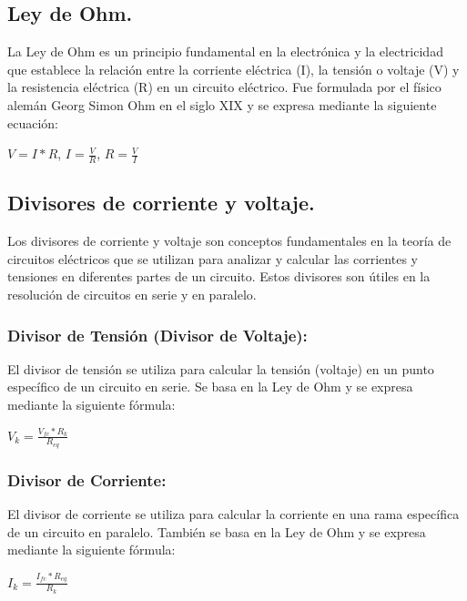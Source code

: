 \documentclass[10pt]{article}
\begin{document}
\begin{multicols}{2}
\subsection{Ley de Ohm.}
La Ley de Ohm es un principio fundamental en la electrónica y la electricidad que establece la relación entre la corriente eléctrica (I), la tensión o voltaje (V) y la resistencia eléctrica (R) en un circuito eléctrico. Fue formulada por el físico alemán Georg Simon Ohm en el siglo XIX y se expresa mediante la siguiente ecuación:
\begin{center}
	$ V=I*R$,  $I=\frac{V}{R}$, $R=\frac{V}{I}$
\end{center}


\subsection{Divisores de corriente y voltaje.}
Los divisores de corriente y voltaje son conceptos fundamentales en la teoría de circuitos eléctricos que se utilizan para analizar y calcular las corrientes y tensiones en diferentes partes de un circuito. Estos divisores son útiles en la resolución de circuitos en serie y en paralelo.
\subsubsection{Divisor de Tensión (Divisor de Voltaje):}
El divisor de tensión se utiliza para calcular la tensión (voltaje) en un punto específico de un circuito en serie. Se basa en la Ley de Ohm y se expresa mediante la siguiente fórmula: 
\begin{center}
$V_{k}=\frac{V_{fc}*R_{k}}{R_{eq}}$
\end{center}
\subsubsection{Divisor de Corriente:}
El divisor de corriente se utiliza para calcular la corriente en una rama específica de un circuito en paralelo. También se basa en la Ley de Ohm y se expresa mediante la siguiente fórmula:
\begin{center}
	$I_{k}=\frac{I_{fc}*R_{eq}}{R_{k}}$
\end{center}



\end{multicols}
\end{document}
